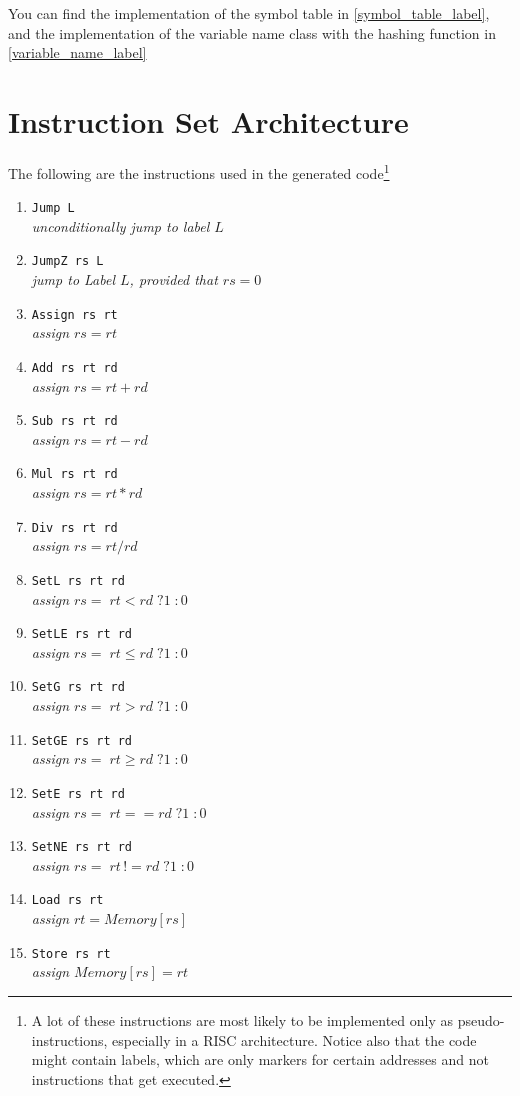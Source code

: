 \documentclass[12pt]{article}
\begin{document}
You can find the implementation of the symbol table in \ref{symbol_table_label}, and the implementation of the variable name class with the hashing function in \ref{variable_name_label}


\section{Instruction Set Architecture}
The following are the instructions used in the generated code\footnote{A lot of these instructions are most likely to be implemented only as pseudo-instructions, especially in a RISC architecture. Notice also that the code might contain labels, which are only markers for certain addresses and not instructions that get executed.}
\begin{enumerate}
\item \texttt{Jump L}\\ \textit{unconditionally jump to label $L$}
\item \texttt{JumpZ rs L}\\ \textit{jump to Label $L$, provided that $rs = 0$}

\item \texttt{Assign rs rt}\\ \textit{assign $rs = rt$}
\item \texttt{Add rs rt rd}\\ \textit{assign $rs = rt + rd$}
\item \texttt{Sub rs rt rd}\\ \textit{assign $rs = rt - rd$}
\item \texttt{Mul rs rt rd}\\ \textit{assign $rs = rt * rd$}
\item \texttt{Div rs rt rd}\\ \textit{assign $rs = rt / rd$}

\item \texttt{SetL rs rt rd}\\ \textit{assign $rs = \; rt < rd \; ? 1 \; : 0$}
\item \texttt{SetLE rs rt rd}\\ \textit{assign $rs = \; rt \leq rd\;  ? 1\;  : 0$}
\item \texttt{SetG rs rt rd}\\ \textit{assign $rs = \; rt > rd \; ? 1 \; : 0$}
\item \texttt{SetGE rs rt rd}\\ \textit{assign $rs = \; rt \geq rd \; ? 1 \; : 0$}
\item \texttt{SetE rs rt rd}\\ \textit{assign $rs = \; rt == rd \; ? 1 \; : 0$}
\item \texttt{SetNE rs rt rd}\\ \textit{assign $rs = \; rt \,!= rd \; ? 1 \; : 0$}
	
\item \texttt{Load rs rt}\\ \textit{assign $rt = Memory[rs]$}
\item \texttt{Store rs rt}\\ \textit{assign $Memory[rs] = rt$}
\end{enumerate}
\end{document}

